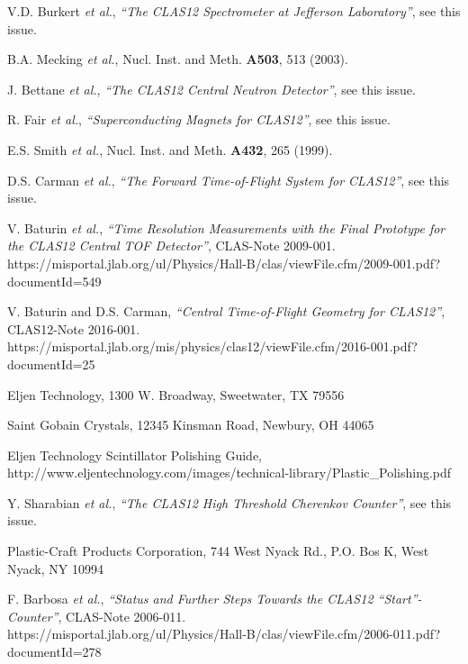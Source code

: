 \documentclass{elsart}
\begin{document}
\begin{thebibliography}{99}

V.D. Burkert {\it et al.}, {\it ``The CLAS12 Spectrometer at Jefferson Laboratory''}, see this issue.

B.A. Mecking {\it et al.}, Nucl. Inst. and Meth. {\bf A503}, 513 (2003).

J. Bettane {\it et al.}, {\it ``The CLAS12 Central Neutron Detector''}, see this issue.

R. Fair {\it et al.}, {\it ``Superconducting Magnets for CLAS12''}, see this issue.  

E.S. Smith {\it et al.}, Nucl. Inst. and Meth. {\bf A432}, 265 (1999).

D.S. Carman {\it et al.}, {\it ``The Forward Time-of-Flight System for CLAS12''}, see this issue.

V. Baturin {\it et al.}, {\it ``Time Resolution Measurements with the Final Prototype for the 
CLAS12 Central TOF Detector''}, CLAS-Note 2009-001.\\
https://misportal.jlab.org/ul/Physics/Hall-B/clas/viewFile.cfm/2009-001.pdf?documentId=549

V. Baturin and D.S. Carman, {\it ``Central Time-of-Flight Geometry for CLAS12''}, CLAS12-Note 
2016-001.\\
https://misportal.jlab.org/mis/physics/clas12/viewFile.cfm/2016-001.pdf?documentId=25

Eljen Technology, 1300 W. Broadway, Sweetwater, TX 79556

Saint Gobain Crystals, 12345 Kinsman Road, Newbury, OH 44065

Eljen Technology Scintillator Polishing Guide,\\
http://www.eljentechnology.com/images/technical-library/Plastic\_Polishing.pdf

Y. Sharabian {\it et al.}, {\it ``The CLAS12 High Threshold Cherenkov Counter''}, see this issue.
  
Plastic-Craft Products Corporation, 744 West Nyack Rd., P.O. Bos K, West Nyack, NY 10994

F. Barbosa {\it et al.}, {\it ``Status and Further Steps Towards the CLAS12 ``Start''-Counter''},
CLAS-Note 2006-011.\\
https://misportal.jlab.org/ul/Physics/Hall-B/clas/viewFile.cfm/2006-011.pdf?documentId=278


\end{thebibliography}
\end{document}
